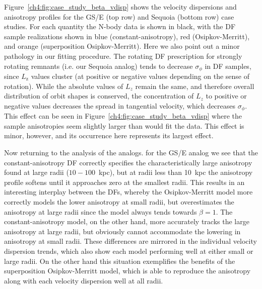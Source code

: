 Figure~\ref{ch4:fig:case_study_beta_vdisp} shows the velocity dispersions and anisotropy profiles for the GS/E (top row) and Sequoia (bottom row) case studies. For each quantity the N-body data is shown in black, with the DF sample realizations shown in blue (constant-anisotropy), red (Osipkov-Merritt), and orange (superposition Osipkov-Merritt). Here we also point out a minor pathology in our fitting procedure. The rotating DF prescription for strongly rotating remnants (i.e. our Sequoia analog) tends to decrease $\sigma_{\phi}$ in DF samples, since $L_\mathrm{z}$ values cluster (at positive or negative values depending on the sense of rotation). While the absolute values of $L_{z}$ remain the same, and therefore overall distribution of orbit shapes is conserved, the concentration of $L_{z}$ to positive or negative values decreases the spread in tangential velocity, which decreases $\sigma_{\phi}$. This effect can be seen in Figure~\ref{ch4:fig:case_study_beta_vdisp} where the sample anisotropies seem slightly larger than would fit the data. This effect is minor, however, and its occurrence here represents its largest effect.

Now returning to the analysis of the analogs. for the GS/E analog we see that the constant-anisotropy DF correctly specifies the characteristically large anisotropy found at large radii ($10-100$~kpc), but at radii less than 10~kpc the anisotropy profile softens until it approaches zero at the smallest radii. This results in an interesting interplay between the DFs, whereby the Osipkov-Merritt model more correctly models the lower anisotropy at small radii, but overestimates the anisotropy at large radii since the model always tends towards $\beta=1$. The constant-anisotropy model, on the other hand, more accurately tracks the large anisotropy at large radii, but obviously cannot accommodate the lowering in anisotropy at small radii. These differences are mirrored in the individual velocity dispersion trends, which also show each model performing well at either small or large radii. On the other hand this situation exemplifies the benefits of the superposition Osipkov-Merritt model, which is able to reproduce the anisotropy along with each velocity dispersion well at all radii.

